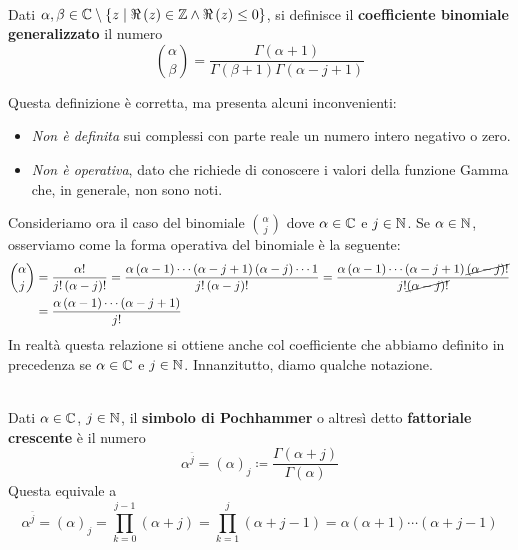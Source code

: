 \begin{define}~{}\\
	Dati $\alpha,\beta\in\mathbb{C}\setminus\left\{z\mid\Re\left(z\right)\in\mathbb{Z}\wedge\Re\left(z\right)\leq0\right\}$, si definisce il \textbf{coefficiente binomiale generalizzato} il numero
	\begin{equation}
		\binom{\alpha}{\beta}=\frac{\Gamma\left(\alpha+1\right)}{\Gamma\left(\beta+1\right)\Gamma\left(\alpha-j+1\right)}
	\end{equation}
\end{define}
Questa definizione è corretta, ma presenta alcuni inconvenienti:
\begin{itemize}
	\item \textit{Non è definita} sui complessi con parte reale un numero intero negativo o zero.
	\item \textit{Non è operativa}, dato che richiede di conoscere i valori della funzione Gamma che, in generale, non sono noti.
\end{itemize}
Consideriamo ora il caso del binomiale $\displaystyle\binom{\alpha}{j}$ dove $\alpha\in\mathbb{C}$ e $j\in\mathbb{N}$. Se $\alpha\in\mathbb{N}$, osserviamo come la forma operativa del binomiale è la seguente:
\begin{align*}
	\binom{\alpha}{j}&=\frac{\alpha!}{j!\left(\alpha-j\right)!}=\frac{\alpha\left(\alpha-1\right)\cdots\left(\alpha-j+1\right)\left(\alpha-j\right)\cdots 1}{j!\left(\alpha-j\right)!}=\frac{\alpha\left(\alpha-1\right)\cdots\left(\alpha-j+1\right)\Ccancel{\left(\alpha-j\right)!}}{j!\Ccancel{\left(\alpha-j\right)!}}\\
	&=\frac{\alpha\left(\alpha-1\right)\cdots\left(\alpha-j+1\right)}{j!}
\end{align*}
In realtà questa relazione si ottiene anche col coefficiente che abbiamo definito in precedenza se $\alpha\in\mathbb{C}$ e $j\in\mathbb{N}$. Innanzitutto, diamo qualche notazione.
\begin{define}~{}\\
	Dati $\alpha\in\mathbb{C}$, $j\in\mathbb{N}$, il \textbf{simbolo di Pochhammer} o altresì detto \textbf{fattoriale crescente} è il numero
	\begin{equation}
		\alpha^{\overline{j}}=\left(\alpha\right)_j\coloneqq\frac{\Gamma\left(\alpha+j\right)}{\Gamma\left(\alpha\right)}
	\end{equation}
	Questa equivale a
	\begin{equation}
	\alpha^{\overline{j}}=\left(\alpha\right)_j=\prod_{k=0}^{j-1}\left(\alpha+j\right)=\prod_{k=1}^{j}\left(\alpha+j-1\right)=\alpha\left(\alpha+1\right)\cdots\left(\alpha+j-1\right)
\end{equation}
\end{define}
